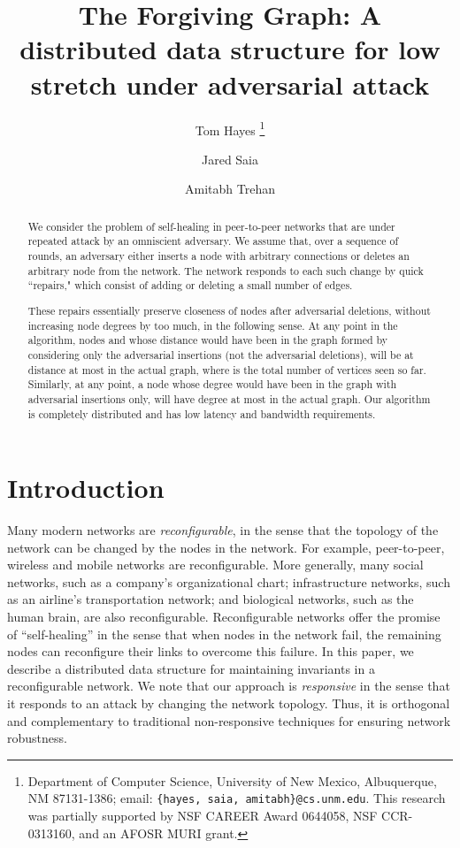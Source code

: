 \documentclass[11pt, letter]{article}
\title{The Forgiving Graph: A distributed data structure for low stretch under adversarial attack}
\author{Tom Hayes \thanks{Department of Computer Science,  
University of New Mexico,  Albuquerque,  NM 87131-1386;
email: {\tt \{hayes, saia, amitabh\}@cs.unm.edu}. 
This research was partially supported by NSF CAREER Award 0644058,
NSF CCR-0313160, and an AFOSR MURI grant.}
\and Jared Saia   \footnotemark[1]
\and Amitabh Trehan  \footnotemark[1] }
\begin{document}
\date{}
\maketitle

\thispagestyle{empty}

\begin{abstract}
We consider the problem of self-healing in peer-to-peer networks that are under repeated attack by an omniscient
adversary. We assume that, over a sequence of rounds, an adversary either inserts a node with arbitrary connections or
deletes an arbitrary node from the network. The network responds to each such change by quick ``repairs," which consist
of adding or deleting a small number of edges.

These repairs essentially preserve closeness of nodes after adversarial deletions, without increasing node degrees by
too much, in the following sense.   At any point in the algorithm, nodes  and  whose distance would have been  in the graph formed by considering only the adversarial insertions (not the adversarial deletions), will be at
distance at most  in the actual graph, where  is the total number of vertices seen so far. Similarly, at any
point, a node  whose degree would have been  in the graph with adversarial insertions only, will have degree at most
 in the actual graph.  Our algorithm is completely distributed and has low latency and bandwidth requirements.

\end{abstract}

\section{Introduction}

Many modern networks are \emph{reconfigurable}, in the sense that the topology of the network can be changed by the
nodes in the network.  For example, peer-to-peer, wireless and mobile networks are reconfigurable.  More generally, many social networks, such as a company's organizational chart; infrastructure networks, such as an airline's transportation network; and biological networks, such as the human brain, are also reconfigurable.  Reconfigurable networks offer the promise of ``self-healing'' in the sense that when nodes in the network fail, the remaining nodes can reconfigure their links to overcome this failure.  In this paper, we describe a distributed data structure for maintaining invariants in a reconfigurable network.  We note that our approach is \emph{responsive} in the sense that it responds to an attack by changing the network topology.  Thus, it is orthogonal and complementary to traditional non-responsive techniques for ensuring network robustness.
\end{document}
